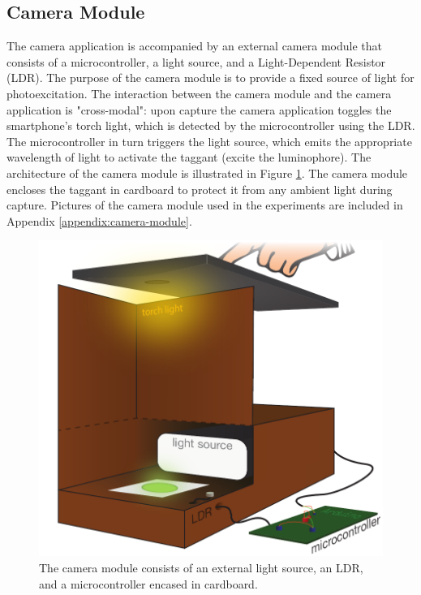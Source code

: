 \documentclass[thesis.tex]{subfiles}
\begin{document}
\subsection{Camera Module}
\label{chapter:camera-module}

The camera application is accompanied by an external camera module that consists of a microcontroller, a light source, and a Light-Dependent Resistor (LDR). The purpose of the camera module is to provide a fixed source of light for photoexcitation. The interaction between the camera module and the camera application is "cross-modal": upon capture the camera application toggles the smartphone's torch light, which is detected by the microcontroller using the LDR. The microcontroller in turn triggers the light source, which emits the appropriate wavelength of light to activate the taggant (excite the luminophore). The architecture of the camera module is illustrated in Figure \ref{figure:camera_module}. The camera module encloses the taggant in cardboard to protect it from any ambient light during capture. Pictures of the camera module used in the experiments are included in Appendix \ref{appendix:camera-module}.

\begin{figure}[h]
\centering \includegraphics[width=13cm]{images/design_implementation/camera_module.pdf}
\caption{The camera module consists of an external light source, an LDR, and a microcontroller encased in cardboard. \label{figure:camera_module}}
\end{figure}
\end{document}
